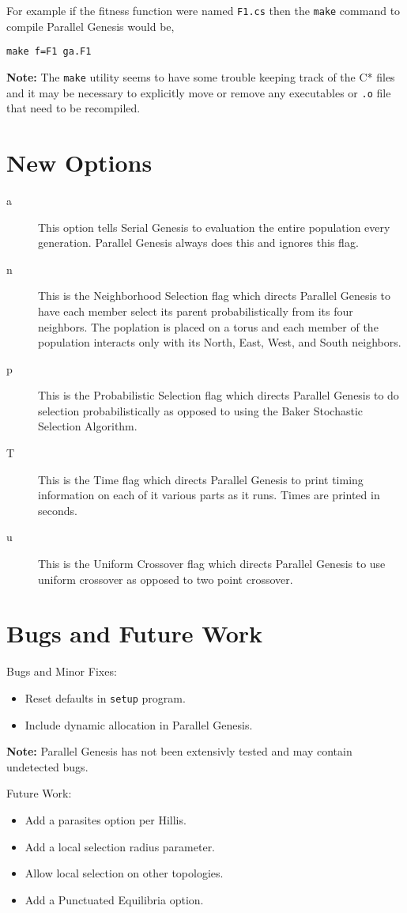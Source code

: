 For example if the fitness function were named {\tt F1.cs} then the {\tt make}
command to compile Parallel Genesis would be,

{\tt make f=F1 ga.F1}

{\bf Note:} The {\tt make} utility seems to have some trouble keeping
track of the C* files and it may be necessary to explicitly move or remove
any executables or {\tt .o} file that need to be recompiled.

\section{New Options}

\begin{description}

\item[a] This option tells Serial Genesis to evaluation the entire population
every generation.  Parallel Genesis always does this and ignores this flag.

\item[n] This is the Neighborhood Selection flag which directs Parallel
Genesis to have each member select its parent probabilistically from its
four neighbors.  The poplation is placed on a torus and each member of the
population interacts only with its North, East, West, and South neighbors.

\item[p] This is the Probabilistic Selection flag which directs Parallel
Genesis to do selection probabilistically as opposed to using the Baker
Stochastic Selection Algorithm.

\item[T] This is the Time flag which directs Parallel Genesis to print timing
information on each of it various parts as it runs.  Times are printed in
seconds.

\item[u] This is the Uniform Crossover flag which directs Parallel Genesis to
use uniform crossover as opposed to two point crossover.

\end{description}

\section{Bugs and Future Work}

{\large Bugs and Minor Fixes:}
\begin{itemize}
\item Reset defaults in {\tt setup} program.
\item Include dynamic allocation in Parallel Genesis.
\end{itemize}
{\bf Note:} Parallel Genesis has not been extensivly tested and may contain
undetected bugs.

\medskip

{\large Future Work:}
\begin{itemize}
\item Add a parasites option per Hillis.
\item Add a local selection radius parameter.
\item Allow local selection on other topologies.
\item Add a Punctuated Equilibria option.
\end{itemize}

